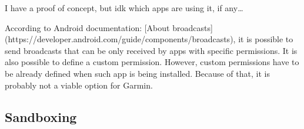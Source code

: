 I have a proof of concept, but idk which apps are using it, if any\ldots

According to Android documentation: [About broadcasts](https://developer.android.com/guide/components/broadcasts),
it is possible to send broadcasts that can be only received by apps with specific permissions.
It is also possible to define a custom permission.
However, custom permissions have to be already defined when such app is being installed.
Because of that, it is probably not a viable option for Garmin.


\subsection{Sandboxing}